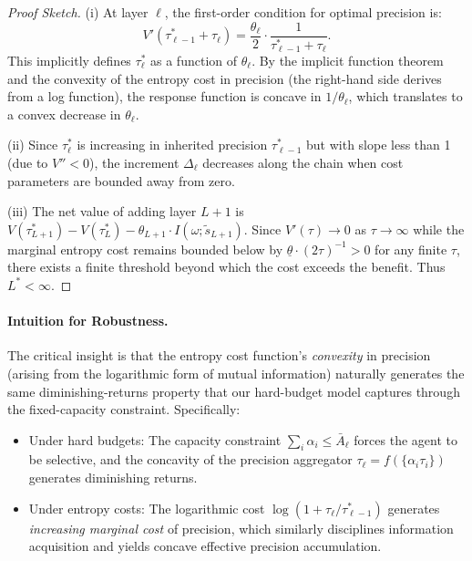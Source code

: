 \begin{proof}[Proof Sketch]
(i) At layer $\ell$, the first-order condition for optimal precision is:
\begin{equation}
    V'(\tau_{\ell-1}^{*} + \tau_\ell) = \frac{\theta_\ell}{2} \cdot \frac{1}{\tau_{\ell-1}^{*} + \tau_\ell}.
\end{equation}
This implicitly defines $\tau_\ell^{*}$ as a function of $\theta_\ell$. By the implicit function theorem and the convexity of the entropy cost in precision (the right-hand side derives from a log function), the response function is concave in $1/\theta_\ell$, which translates to a convex decrease in $\theta_\ell$.

(ii) Since $\tau_\ell^{*}$ is increasing in inherited precision $\tau_{\ell-1}^{*}$ but with slope less than 1 (due to $V'' < 0$), the increment $\Delta_\ell$ decreases along the chain when cost parameters are bounded away from zero.

(iii) The net value of adding layer $L+1$ is $V(\tau_{L+1}^{*}) - V(\tau_{L}^{*}) - \theta_{L+1} \cdot I(\omega; \tilde{s}_{L+1})$. Since $V'(\tau) \to 0$ as $\tau \to \infty$ while the marginal entropy cost remains bounded below by $\underline{\theta} \cdot (2\tau)^{-1} > 0$ for any finite $\tau$, there exists a finite threshold beyond which the cost exceeds the benefit. Thus $L^{*} < \infty$.
\end{proof}

\paragraph{Intuition for Robustness.} The critical insight is that the entropy cost function's \emph{convexity} in precision (arising from the logarithmic form of mutual information) naturally generates the same diminishing-returns property that our hard-budget model captures through the fixed-capacity constraint. Specifically:

\begin{itemize}
    \item Under hard budgets: The capacity constraint $\sum_{i} \alpha_i \leq \bar{A}_\ell$ forces the agent to be selective, and the concavity of the precision aggregator $\tau_\ell = f(\{\alpha_i \tau_i\})$ generates diminishing returns.
    
    \item Under entropy costs: The logarithmic cost $\log(1 + \tau_\ell / \tau_{\ell-1}^{*})$ generates \emph{increasing marginal cost} of precision, which similarly disciplines information acquisition and yields concave effective precision accumulation.
\end{itemize}

